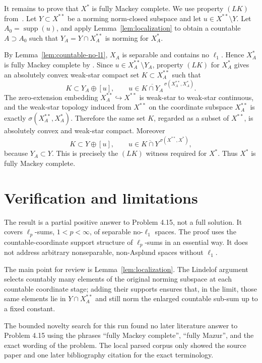 \documentclass[11pt]{article}
\newcommand{\ol}{\overline}
\newcommand{\supp}{\operatorname{supp}}
\begin{document}
It remains to prove that $X^*$ is fully Mackey complete.  We use property
$(LK)$ from~\cite[Theorem 3.5]{GMR}.  Let $Y\subset X^{**}$ be a norming
norm-closed subspace and let $u\in X^{**}\setminus Y$.  Let
$A_0=\supp(u)$, and apply Lemma~\ref{lem:localization} to obtain a countable
$A\supset A_0$ such that $Y_A=Y\cap X_A^{**}$ is norming for $X_A^*$.

By Lemma~\ref{lem:countable-no-l1}, $X_A$ is separable and contains no
$\ell_1$.  Hence $X_A^*$ is fully Mackey complete by
\cite[Corollary 4.8]{GMR}.  Since $u\in X_A^{**}\setminus Y_A$, property
$(LK)$ for $X_A^*$ gives an absolutely convex weak-star compact set
$K\subset X_A^{**}$ such that
\[
K\subset Y_A\oplus [u],
\qquad
u\in \ol{K\cap Y_A}^{\,\sigma(X_A^{**},X_A^*)}.
\]
The zero-extension embedding $X_A^{**}\hookrightarrow X^{**}$ is weak-star to
weak-star continuous, and the weak-star topology induced from $X^{**}$ on the
coordinate subspace $X_A^{**}$ is exactly $\sigma(X_A^{**},X_A^*)$.  Therefore
the same set $K$, regarded as a subset of $X^{**}$, is absolutely convex and
weak-star compact.  Moreover
\[
K\subset Y\oplus [u],
\qquad
u\in \ol{K\cap Y}^{\,\sigma(X^{**},X^*)},
\]
because $Y_A\subset Y$.  This is precisely the $(LK)$ witness required for
$X^*$.  Thus $X^*$ is fully Mackey complete.

\section*{Verification and limitations}

The result is a partial positive answer to Problem 4.15, not a full solution.
It covers $\ell_p$-sums, $1<p<\infty$, of separable no-$\ell_1$ spaces.  The
proof uses the countable-coordinate support structure of $\ell_p$-sums in an
essential way.  It does not address arbitrary nonseparable, non-Asplund spaces
without $\ell_1$.

The main point for review is Lemma~\ref{lem:localization}.  The Lindelof
argument selects countably many elements of the original norming subspace at
each countable coordinate stage; adding their supports ensures that, in the
limit, those same elements lie in $Y\cap X_A^{**}$ and still norm the enlarged
countable sub-sum up to a fixed constant.

The bounded novelty search for this run found no later literature answer to
Problem 4.15 using the phrases ``fully Mackey complete'', ``fully Mazur'', and
the exact wording of the problem.  The local parsed corpus only showed the
source paper and one later bibliography citation for the exact terminology.
\end{document}
